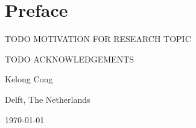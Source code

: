 \chapter*{Preface}
TODO MOTIVATION FOR RESEARCH TOPIC

\vspace{1\baselineskip}

\noindent
TODO ACKNOWLEDGEMENTS

\vspace{1\baselineskip}

\noindent
Kelong Cong

\vspace{1\baselineskip}

\noindent
Delft, The Netherlands

\noindent
\today
